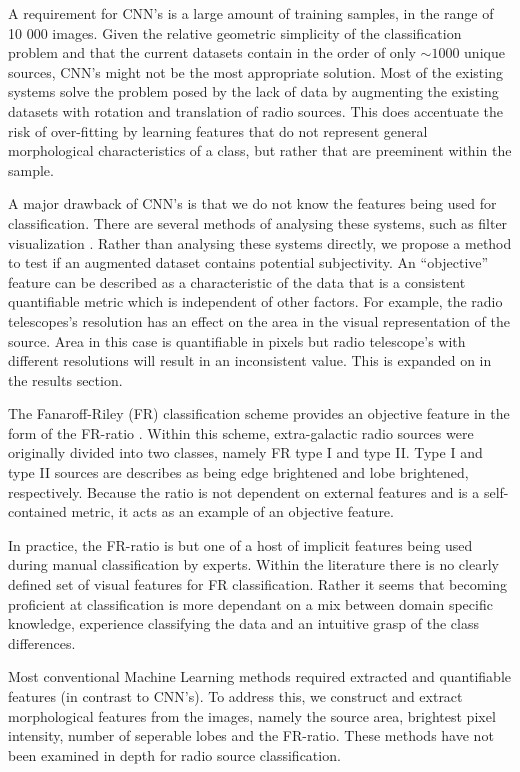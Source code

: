 \documentclass[conference]{IEEEtran}
\begin{document}
A requirement for CNN's is a large amount of training samples, in the range of 10 000 images. Given the relative geometric simplicity of the classification problem and that the current datasets contain in the order of only $\sim1000$ unique sources, CNN's might not be the most appropriate solution. 
Most of the existing systems solve the problem posed by the lack of data by augmenting the existing datasets with rotation and translation of radio sources. This does accentuate the risk of over-fitting by learning features that do not represent general morphological characteristics of a class, but rather that are preeminent within the sample.

A major drawback of CNN's is that we do not know the features being used for classification. There are several methods of analysing these systems, such as filter visualization \cite{aniyan_thorat_2017}. Rather than analysing these systems directly, we propose a method to test if an augmented dataset contains potential subjectivity. An ``objective'' feature can be described as a characteristic of the data that is a consistent quantifiable metric which is independent of other factors. For example, the radio telescopes's resolution has an effect on the area in the visual representation of the source. Area in this case is quantifiable in pixels but radio telescope's with different resolutions will result in an inconsistent value. This is expanded on in the results section.

The Fanaroff-Riley (FR) classification scheme provides an objective feature in the form of the FR-ratio \cite{fanaroff_riley_1974}. Within this scheme, extra-galactic radio sources were originally divided into two classes, namely FR type I and type II. Type I and type II sources are describes as being edge brightened and lobe brightened, respectively. Because the ratio is not dependent on external features and is a self-contained metric, it acts as an example of an objective feature.

In practice, the FR-ratio is but one of a host of implicit features being used during manual classification by experts. Within the literature there is no 
clearly defined set of visual features for FR classification. Rather it seems that
becoming proficient at classification is more dependant on a mix between domain 
specific knowledge, experience classifying the data and an intuitive grasp of the class differences. 

Most conventional Machine Learning methods required extracted and quantifiable features (in contrast to CNN's). To address this, we construct and extract morphological features from the images, namely the source area, brightest pixel intensity, number of seperable lobes and the FR-ratio. These methods have not been examined in depth for radio source classification.
\end{document}
